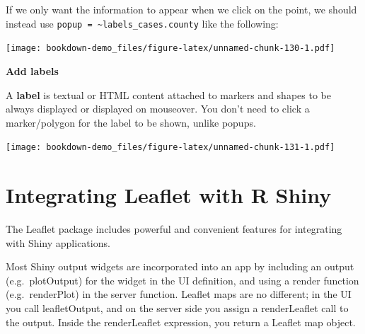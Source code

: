 \documentclass[]{book}
\newenvironment{Shaded}{\begin{snugshade}}{\end{snugshade}}
\newcommand{\KeywordTok}[1]{\textcolor[rgb]{0.13,0.29,0.53}{\textbf{#1}}}
\newcommand{\DataTypeTok}[1]{\textcolor[rgb]{0.13,0.29,0.53}{#1}}
\newcommand{\StringTok}[1]{\textcolor[rgb]{0.31,0.60,0.02}{#1}}
\newcommand{\OperatorTok}[1]{\textcolor[rgb]{0.81,0.36,0.00}{\textbf{#1}}}
\newcommand{\NormalTok}[1]{#1}
\begin{document}
If we only want the information to appear when we click on the point, we
should instead use
\texttt{popup\ =\ \textasciitilde{}labels\_cases.county} like the
following:

\begin{Shaded}
\end{Shaded}

\texttt{[image: bookdown-demo\_files/figure-latex/unnamed-chunk-130-1.pdf]}

\textbf{Add labels}

A \textbf{label} is textual or HTML content attached to markers and
shapes to be always displayed or displayed on mouseover. You don't need
to click a marker/polygon for the label to be shown, unlike popups.

\begin{Shaded}
\end{Shaded}

\texttt{[image: bookdown-demo\_files/figure-latex/unnamed-chunk-131-1.pdf]}

\section{Integrating Leaflet with R
Shiny}\label{integrating-leaflet-with-r-shiny}

The Leaflet package includes powerful and convenient features for
integrating with Shiny applications.

Most Shiny output widgets are incorporated into an app by including an
output (e.g.~plotOutput) for the widget in the UI definition, and using
a render function (e.g.~renderPlot) in the server function. Leaflet maps
are no different; in the UI you call leafletOutput, and on the server
side you assign a renderLeaflet call to the output. Inside the
renderLeaflet expression, you return a Leaflet map object.
\end{document}
